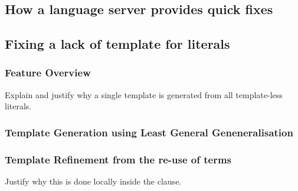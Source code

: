 \documentclass[../main.tex]{subfiles}
\begin{document}
\subsection{How a language server provides quick fixes}

\subsection{Fixing a lack of template for literals}

\subsubsection{Feature Overview}
Explain and justify why a single template is generated from all template-less literals. 

\subsubsection{Template Generation using Least General Geneneralisation}

\subsubsection{Template Refinement from the re-use of terms}
Justify why this is done locally inside the clause.
\end{document}
